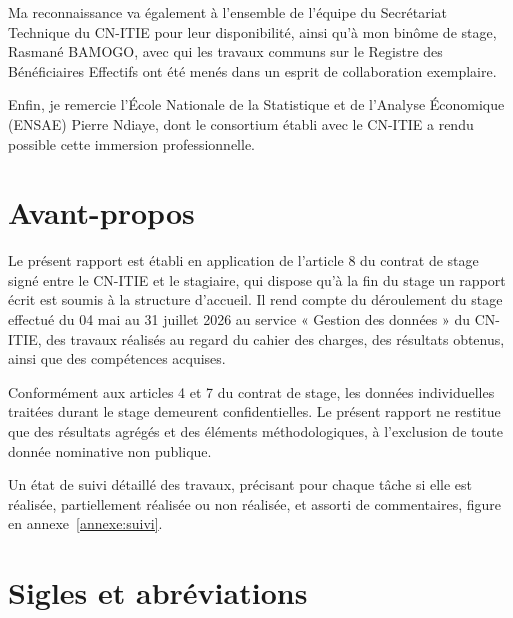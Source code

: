 \documentclass[12pt, a4paper]{article}
\begin{document}
Ma reconnaissance va également à l'ensemble de l'équipe du Secrétariat Technique
du CN-ITIE pour leur disponibilité, ainsi qu'à mon binôme de stage,
Rasmané BAMOGO, avec qui les travaux communs sur le Registre des
Bénéficiaires Effectifs ont été menés dans un esprit de collaboration exemplaire.

Enfin, je remercie l'École Nationale de la Statistique et de l'Analyse Économique
(ENSAE) Pierre Ndiaye, dont le consortium établi avec le CN-ITIE a rendu possible
cette immersion professionnelle.

\clearpage

\section*{Avant-propos}

Le présent rapport est établi en application de l'article 8 du contrat de stage
signé entre le CN-ITIE et le stagiaire, qui dispose qu'à la fin du stage un
rapport écrit est soumis à la structure d'accueil. Il rend compte du déroulement
du stage effectué du 04 mai au 31 juillet 2026 au service « Gestion des données »
du CN-ITIE, des travaux réalisés au regard du cahier des charges, des résultats
obtenus, ainsi que des compétences acquises.

Conformément aux articles 4 et 7 du contrat de stage, les données individuelles
traitées durant le stage demeurent confidentielles. Le présent rapport ne
restitue que des résultats agrégés et des éléments méthodologiques, à
l'exclusion de toute donnée nominative non publique.

Un état de suivi détaillé des travaux, précisant pour chaque tâche si elle est
réalisée, partiellement réalisée ou non réalisée, et assorti de commentaires,
figure en annexe~\ref{annexe:suivi}.

\clearpage

\section*{Sigles et abréviations}
\end{document}
